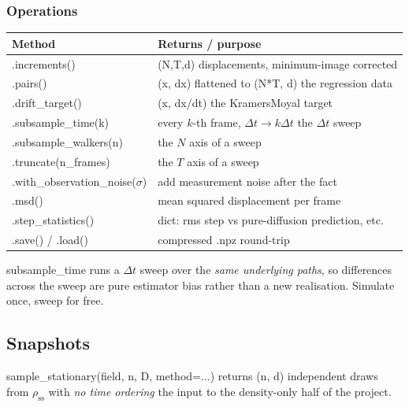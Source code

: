 \documentclass[11pt,a4paper]{article}
\newcommand{\code}[1]{{\ttfamily\small #1}}
\begin{document}
\subsubsection*{Operations}

\begin{center}
\begin{tabular}{@{}L{0.34\textwidth} L{0.60\textwidth}@{}}
\toprule
\textbf{Method} & \textbf{Returns / purpose} \\
\midrule
\code{.increments()}                & \code{(N,T,d)} displacements, minimum-image corrected \\
\code{.pairs()}                     & \code{(x, dx)} flattened to \code{(N*T, d)} \textemdash{} the regression data \\
\code{.drift\_target()}             & \code{(x, dx/dt)} \textemdash{} the Kramers\textendash{}Moyal target \\
\code{.subsample\_time(k)}          & every $k$-th frame, $\Delta t\!\to\!k\Delta t$ \textemdash{} the $\Delta t$ sweep \\
\code{.subsample\_walkers(n)}       & the $N$ axis of a sweep \\
\code{.truncate(n\_frames)}         & the $T$ axis of a sweep \\
\code{.with\_observation\_noise($\sigma$)} & add measurement noise after the fact \\
\code{.msd()}                       & mean squared displacement per frame \\
\code{.step\_statistics()}          & dict: rms step vs pure-diffusion prediction, etc. \\
\code{.save() / .load()}            & compressed \code{.npz} round-trip \\
\bottomrule
\end{tabular}
\end{center}

\begin{keybox}
\code{subsample\_time} runs a $\Delta t$ sweep over the \emph{same underlying paths},
so differences across the sweep are pure estimator bias rather than a new realisation.
Simulate once, sweep for free.
\end{keybox}

\subsection{Snapshots}

\code{sample\_stationary(field, n, D, method=...)} returns \code{(n, d)} independent
draws from $\rho_{\mathrm{ss}}$ with \emph{no time ordering} \textemdash{} the input to
the density-only half of the project.
\end{document}
